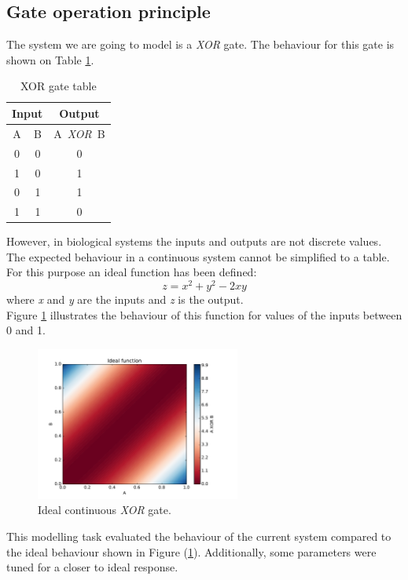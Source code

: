 \documentclass[10pt]{article}
\begin{document}
\subsection{Gate operation principle}
The system we are going to model is a \textit{XOR} gate. The behaviour for this gate is shown on Table \ref{tb:xor}. 
\begin{table}[h]
	\centering
	\caption{XOR gate table} \label{tb:xor}
	\begin{tabular}{c|c|c}
	\multicolumn{2}{c|}{Input} & Output \\ \hline
	A & B & A~\textit{XOR}~B\\ 
	0 & 0 & 0 \\
	1 & 0 & 1 \\
	0 & 1 & 1 \\
	1 & 1 & 0 
	\end{tabular}
\end{table} \par  
However, in biological systems the inputs and outputs are not discrete values. The expected behaviour in a continuous system cannot be simplified to a table. For this purpose an ideal function has been defined:
\begin{equation}
z = x^2 + y^2-2xy
\end{equation} 
where \textit{x} and \textit{y} are the inputs and \textit{z} is the output.\\
Figure \ref{fig:ideal} illustrates the behaviour of this function for values of the inputs between 0 and 1. 
\begin{figure}[h]
	\centering
	\includegraphics[width=0.6\textwidth]{IdealSurface.pdf} 
	\caption{Ideal continuous \textit{XOR} gate.}\label{fig:ideal}
\end{figure}
This modelling task evaluated the behaviour of the current system compared to the ideal behaviour shown in Figure (\ref{fig:ideal}). Additionally,  some parameters were tuned for a closer to ideal response. 
\newpage
\end{document}
